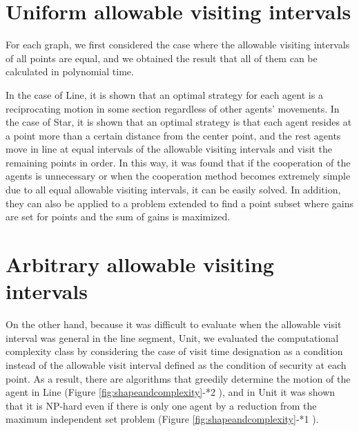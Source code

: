 \section{Uniform allowable visiting intervals}
For each graph, we first considered the case where the allowable visiting intervals of all points are equal, and we obtained the result that all of them can be calculated in polynomial time.

In the case of Line, it is shown that an optimal strategy for each agent
is a reciprocating motion in some section regardless of other agents' movements.
In the case of Star, it is shown that an optimal strategy is that
each agent resides at a point more than a certain distance from the center point,
and the rest agents move in line at equal intervals of the allowable visiting intervals and visit the remaining points in order.
In this way, it was found that if the cooperation of the agents is unnecessary or when the cooperation method becomes extremely simple due to all equal allowable visiting intervals, it can be easily solved.
In addition, they can also be applied to a problem extended to find a point subset where gains are set for points and the sum of gains is maximized.



\section{Arbitrary allowable visiting intervals}

On the other hand, because it was difficult to evaluate when the allowable visit interval was general in the line segment, Unit, we evaluated the computational complexity class by considering the case of visit time designation as a condition instead of the allowable visit interval defined as the condition of security at each point.
As a result, there are algorithms that greedily determine the motion of the agent in Line
(Figure \ref{fig:shapeandcomplexity}-*2 ),
and in Unit it was shown that it is NP-hard even if there is only one agent by a reduction from the maximum independent set problem
(Figure \ref{fig:shapeandcomplexity}-*1 ).
